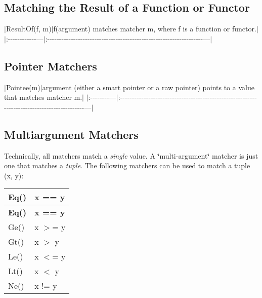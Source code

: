 \subsection*{Matching the Result of a Function or Functor}

$\vert${\ttfamily Result\+Of(f, m)}$\vert${\ttfamily f(argument)} matches matcher {\ttfamily m}, where {\ttfamily f} is a function or functor.$\vert$ $\vert$\+:-\/-\/-\/-\/-\/-\/-\/-\/-\/-\/-\/-\/---$\vert$\+:-\/-\/-\/-\/-\/-\/-\/-\/-\/-\/-\/-\/-\/-\/-\/-\/-\/-\/-\/-\/-\/-\/-\/-\/-\/-\/-\/-\/-\/-\/-\/-\/-\/-\/-\/-\/-\/-\/-\/-\/-\/-\/-\/-\/-\/-\/-\/-\/-\/-\/-\/-\/-\/-\/-\/-\/-\/-\/-\/-\/-\/-\/-\/-\/-\/-\/---$\vert$

\subsection*{Pointer Matchers}

$\vert${\ttfamily Pointee(m)}$\vert${\ttfamily argument} (either a smart pointer or a raw pointer) points to a value that matches matcher {\ttfamily m}.$\vert$ $\vert$\+:-\/-\/-\/-\/-\/-\/-\/-\/---$\vert$\+:-\/-\/-\/-\/-\/-\/-\/-\/-\/-\/-\/-\/-\/-\/-\/-\/-\/-\/-\/-\/-\/-\/-\/-\/-\/-\/-\/-\/-\/-\/-\/-\/-\/-\/-\/-\/-\/-\/-\/-\/-\/-\/-\/-\/-\/-\/-\/-\/-\/-\/-\/-\/-\/-\/-\/-\/-\/-\/-\/-\/-\/-\/-\/-\/-\/-\/-\/-\/-\/-\/-\/-\/-\/-\/-\/-\/-\/-\/-\/-\/-\/-\/-\/-\/-\/-\/-\/-\/-\/-\/-\/-\/---$\vert$

\subsection*{Multiargument Matchers}

Technically, all matchers match a {\itshape single} value. A \char`\"{}multi-\/argument\char`\"{} matcher is just one that matches a {\itshape tuple}. The following matchers can be used to match a tuple {\ttfamily (x, y)}\+:

\tabulinesep=1mm
\begin{longtabu}spread 0pt [c]{*{2}{|X[-1]}|}
\hline
\cellcolor{\tableheadbgcolor}\textbf{ {\ttfamily Eq()}  }&\cellcolor{\tableheadbgcolor}\textbf{ {\ttfamily x == y}   }\\
\endfirsthead
\hline
\endfoot
\hline
\cellcolor{\tableheadbgcolor}\textbf{ {\ttfamily Eq()}  }&\cellcolor{\tableheadbgcolor}\textbf{ {\ttfamily x == y}   }\\
\endhead
{\ttfamily Ge()}  &{\ttfamily x $>$= y}   \\
{\ttfamily Gt()}  &{\ttfamily x $>$ y}   \\
{\ttfamily Le()}  &{\ttfamily x $<$= y}   \\
{\ttfamily Lt()}  &{\ttfamily x $<$ y}   \\
{\ttfamily Ne()}  &{\ttfamily x != y}   \\
\end{longtabu}


